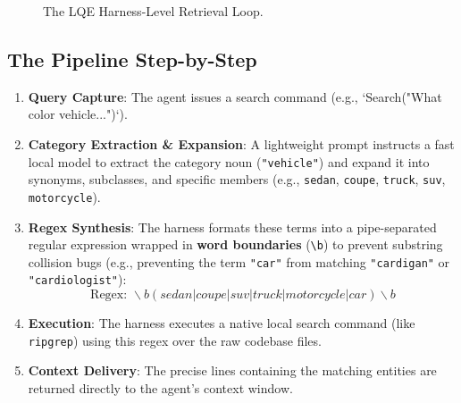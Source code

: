 \documentclass[11pt,a4paper]{article}
\begin{document}
\begin{figure}[h]
\centering
{}
\caption{The LQE Harness-Level Retrieval Loop.}
\label{fig:lqe_loop}
\end{figure}

\subsection{The Pipeline Step-by-Step}
\begin{enumerate}
    \item \textbf{Query Capture}: The agent issues a search command (e.g., `Search("What color vehicle...")`).
    \item \textbf{Category Extraction \& Expansion}: A lightweight prompt instructs a fast local model to extract the category noun (\texttt{"vehicle"}) and expand it into synonyms, subclasses, and specific members (e.g., \texttt{sedan}, \texttt{coupe}, \texttt{truck}, \texttt{suv}, \texttt{motorcycle}).
    \item \textbf{Regex Synthesis}: The harness formats these terms into a pipe-separated regular expression wrapped in \textbf{word boundaries} (\texttt{\textbackslash b}) to prevent substring collision bugs (e.g., preventing the term \texttt{"car"} from matching \texttt{"cardigan"} or \texttt{"cardiologist"}):
       $$\text{Regex: } \backslash b(sedan|coupe|suv|truck|motorcycle|car)\backslash b$$
    \item \textbf{Execution}: The harness executes a native local search command (like \texttt{ripgrep}) using this regex over the raw codebase files.
    \item \textbf{Context Delivery}: The precise lines containing the matching entities are returned directly to the agent's context window.
\end{enumerate}
\end{document}
